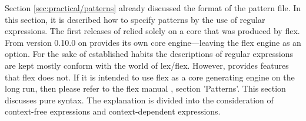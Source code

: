 Section \ref{sec:practical/patterns} already discussed the format of the
pattern file. In this section, it is described how to specify patterns by the
use of regular expressions. The first releases of {\quex} relied solely on a
core that was produced by flex. From version 0.10.0 on {\quex} provides its own
core engine---leaving the flex engine as an option. For the sake of established
habits the descriptions of regular expressions are kept mostly conform with the
world of lex/flex.  However, {\quex} provides features that flex does not. If
it is intended to use flex as a core generating engine on the long run, then please refer to
the flex manual \cite{}, section 'Patterns'. This section discusses pure
{\quex} syntax. The explanation is divided into the consideration of
context-free expressions and context-dependent expressions.


     
